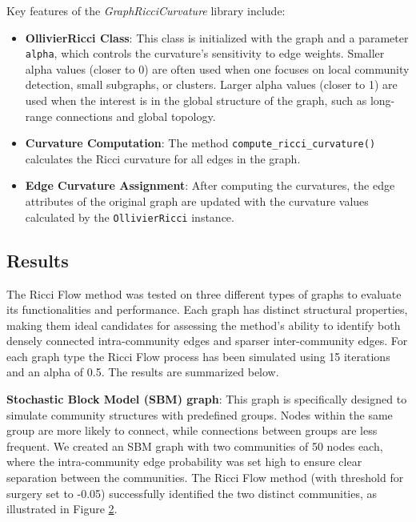 \documentclass[12pt,a4paper]{article}
\begin{document}
Key features of the \textit{GraphRicciCurvature} library include:

\begin{itemize}
    \item \textbf{OllivierRicci Class}: This class is initialized with the graph and a parameter \texttt{alpha}, which controls the curvature's sensitivity to edge weights. Smaller alpha values (closer to 0) are often used when one focuses on local community detection, small subgraphs, or clusters. Larger alpha values (closer to 1) are used when the interest is in the global structure of the graph, such as long-range connections and global topology.
    
    \item \textbf{Curvature Computation}: The method \texttt{compute\_ricci\_curvature()} calculates the Ricci curvature for all edges in the graph.
    
    \item \textbf{Edge Curvature Assignment}: After computing the curvatures, the edge attributes of the original graph are updated with the curvature values calculated by the \texttt{OllivierRicci} instance. 
\end{itemize}



\subsection{Results}

The Ricci Flow method was tested on three different types of graphs to evaluate its functionalities and performance. Each graph has distinct structural properties, making them ideal candidates for assessing the method’s ability to identify both densely connected intra-community edges and sparser inter-community edges. For each graph type the Ricci Flow process has been simulated using 15 iterations and an alpha of 0.5. The results are summarized below. 

\textbf{Stochastic Block Model (SBM) graph}: This graph is specifically designed to simulate community structures with predefined groups. Nodes within the same group are more likely to connect, while connections between groups are less frequent. We created an SBM graph with two communities of 50 nodes each, where the intra-community edge probability was set high to ensure clear separation between the communities. The Ricci Flow method (with threshold for surgery set to -0.05) successfully identified the two distinct communities, as illustrated in Figure \hyperref[fig2]{2}.
\end{document}
